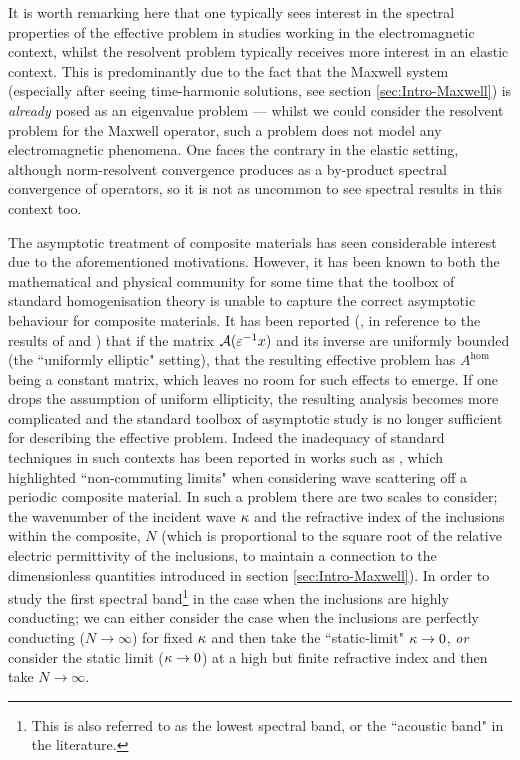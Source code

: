 It is worth remarking here that one typically sees interest in the spectral properties of the effective problem in studies working in the electromagnetic context, whilst the resolvent problem typically receives more interest in an elastic context.
This is predominantly due to the fact that the Maxwell system (especially after seeing time-harmonic solutions, see section \ref{sec:Intro-Maxwell}) is \emph{already} posed as an eigenvalue problem --- whilst we could consider the resolvent problem for the Maxwell operator, such a problem does not model any electromagnetic phenomena.
One faces the contrary in the elastic setting, although norm-resolvent convergence produces as a by-product spectral convergence of operators, so it is not as uncommon to see spectral results in this context too.

The asymptotic treatment of composite materials has seen considerable interest due to the aforementioned motivations.
However, it has been known to both the mathematical and physical community for some time that the toolbox of standard homogenisation theory is unable to capture the correct asymptotic behaviour for composite materials.
It has been reported (\cite{cherednichenko2019unified}, in reference to the results of \cite{birman2004second} and ) that if the matrix $\mathcal{A}(\varepsilon^{-1}x)$ and its inverse are uniformly bounded (the ``uniformly elliptic" setting), that the resulting effective problem has $A^{\mathrm{hom}}$ being a constant matrix, which leaves no room for such effects to emerge.
If one drops the assumption of uniform ellipticity, the resulting analysis becomes more complicated and the standard toolbox of asymptotic study is no longer sufficient for describing the effective problem.
Indeed the inadequacy of standard techniques in such contexts has been reported in works such as \cite{nicorovici1995photonic}, which highlighted ``non-commuting limits" when considering wave scattering off a periodic composite material.
In such a problem there are two scales to consider; the wavenumber of the incident wave $\kappa$ and the refractive index of the inclusions within the composite, $N$ (which is proportional to the square root of the relative electric permittivity of the inclusions, to maintain a connection to the dimensionless quantities introduced in section \ref{sec:Intro-Maxwell}).
In order to study the first spectral band\footnote{This is also referred to as the lowest spectral band, or the ``acoustic band" in the literature.} in the case when the inclusions are highly conducting; we can either consider the case when the inclusions are perfectly conducting ($N\rightarrow\infty$) for fixed $\kappa$ and then take the ``static-limit" $\kappa\rightarrow0$, \emph{or} consider the static limit ($\kappa\rightarrow0$) at a high but finite refractive index and then take $N\rightarrow\infty$.
